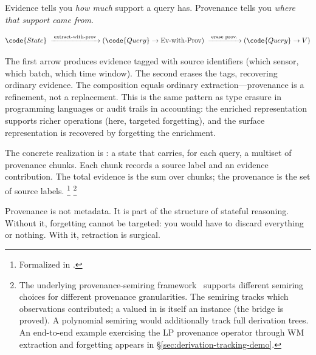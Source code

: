\documentclass[11pt,openany]{report}
\begin{document}
Evidence tells you \emph{how much} support a query has.  Provenance
tells you \emph{where that support came from}.

\[
  \code{State}
  \;\xrightarrow{\;\text{extract-with-prov}\;}
  (\code{Query} \to \text{Ev-with-Prov})
  \;\xrightarrow{\;\text{erase prov.}\;}
  (\code{Query} \to V)
\]

\noindent
The first arrow produces evidence tagged with source identifiers
(which sensor, which batch, which time window).  The second erases
the tags, recovering ordinary evidence.  The composition equals
ordinary extraction---provenance is a refinement, not a replacement.
This is the same pattern as type erasure in programming languages or
audit trails in accounting: the enriched representation supports
richer operations (here, targeted forgetting), and the surface
representation is recovered by forgetting the enrichment.

The concrete realization is : a state that
carries, for each query, a multiset of provenance chunks.  Each chunk
records a source label and an evidence contribution.  The total
evidence is the sum over chunks; the provenance is the set of source
labels.%
\footnote{Formalized in
.}%
\footnote{The underlying provenance-semiring
framework~\cite{GreenKarvounarakisTannen2007} supports different
semiring choices for different provenance granularities.  The
 semiring tracks which observations contributed; a
 valued in  is itself an
 instance (the bridge is proved).  A
polynomial semiring would additionally track full derivation trees.
An end-to-end example exercising the LP provenance operator
 through WM extraction and forgetting
appears in \S\ref{sec:derivation-tracking-demo}.}

Provenance is not metadata.  It is part of the structure of stateful
reasoning.  Without it, forgetting cannot be targeted: you would have
to discard everything or nothing.  With it, retraction is surgical.

\end{document}
